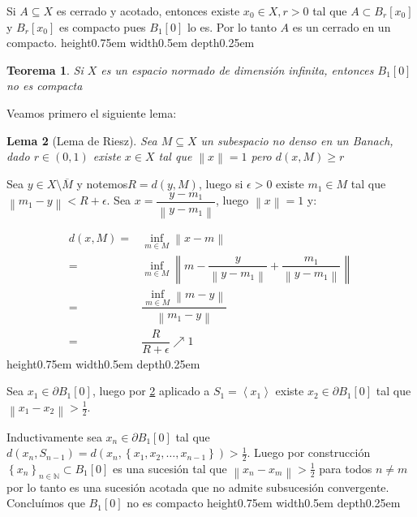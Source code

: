 \documentclass[11pt]{article}
\newcommand{\N}{{\mathbb{N}}}
\newcommand{\norm}[1]{\left\lVert#1\right\rVert}
\newcommand{\ip}[1]{\left\langle#1\right\rangle}
\newcommand{\sett}[1]{\left\lbrace#1\right\rbrace}
\newtheorem{theorem}{Teorema}
\numberwithin{theorem}{subsection}
\newtheorem{lemma}[theorem]{Lema}
\newenvironment{proof}[1][Demostraci\'on]{\begin{trivlist}
		\item[\hskip \labelsep {\bfseries #1}]}{\end{trivlist}}
\newcommand{\qed}{\nobreak \ifvmode \relax \else
	\ifdim\lastskip<1.5em \hskip-\lastskip
	\hskip1.5em plus0em minus0.5em \fi \nobreak
	\vrule height0.75em width0.5em depth0.25em\fi}
\begin{document}
\begin{proof}
	Si $A\subseteq X$ es cerrado y acotado, entonces existe $x_0 \in X, r > 0$ tal que $A \subset B_{r}[x_0]$ y $B_{r}[x_0]$ es compacto pues $B_1[0]$ lo es. Por lo tanto $A$ es un cerrado en un compacto. \qed
\end{proof}

\begin{theorem}
	Si $X$ es un espacio normado de dimensi\'on infinita, entonces $B_1[0]$ no es compacta
\end{theorem}

\begin{proof}
	Veamos primero el siguiente lema:
	
	\begin{lemma}[Lema de Riesz]
		\label{Lema de Riesz}
		Sea $M \subseteq X$ un subespacio no denso en un Banach, dado $r \in (0,1)$ existe $x \in X$ tal que $\norm{x} = 1$ pero $d(x,M) \geq r$ 
	\end{lemma}
	
	\begin{proof}[Demostraci\'on del lema]
		Sea $y \in X \setminus \overline{M}$ y notemos$R = d(y,M)$, luego si $\epsilon > 0$ existe $m_1 \in M$ tal que $\norm{m_1 - y} < R + \epsilon$. Sea $x = \dfrac{y - m_1}{\norm{y - m_1}}$, luego $\norm{x}=1$ y:
		
		\[
		\begin{aligned}
		d(x,M) = & \inf\limits_{m \in M} \norm{x - m} \\ 
		= & \inf\limits_{m \in M} \norm{m - \dfrac{y}{\norm{y - m_1}} + \dfrac{m_1}{\norm{y - m_1}}} \\
		= & \dfrac{\inf\limits_{m \in M} \norm{m - y} }{\norm{m_1 - y}} \\
		= & \dfrac{R}{R + \epsilon} \nearrow 1
		\end{aligned}
		\]
		\qed
		
	\end{proof}
	
	Sea $x_1 \in \partial B_1[0]$, luego por \ref{Lema de Riesz} aplicado a $S_1 = \ip{x_1}$ existe $x_2 \in \partial B_1[0]$ tal que $\norm{x_1 - x_2} > \frac{1}{2}$.
	
	Inductivamente sea $x_n \in \partial B_1[0]$ tal que $d(x_n, S_{n-1}) = d(x_n , \sett{x_1 , x_2 , \dots , x_{n-1}}) > \frac{1}{2}$. Luego por construcci\'on $\sett{x_n}_{n \in \N} \subset B_1[0]$ es una sucesi\'on tal que $\norm{x_n - x_m} > \frac{1}{2}$ para todos $n \neq m$ por lo tanto es una sucesi\'on acotada que no admite subsucesi\'on convergente. Conclu\'imos que $B_1[0]$ no es compacto \qed
	
\end{proof}
\end{document}
